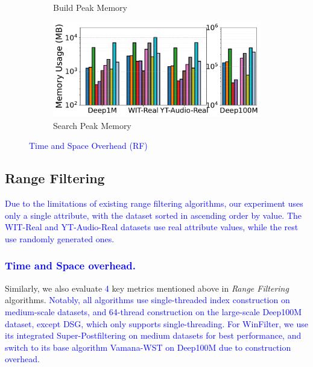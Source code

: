\documentclass[sigconf, nonacm]{acmart}
\begin{document}
{\begin{figure}[t]
\begin{subfigure}[t]{0.495\columnwidth}
			\caption{\footnotesize Build Peak Memory}
			\label{fig:rangeFilter_build_memory_mb}
		\end{subfigure}
		\hfill
		\begin{subfigure}[t]{0.495\columnwidth}
			\centering
			\includegraphics[width=\linewidth]{figures/searchMem/range_memory_comparison.pdf}
			\caption{\footnotesize Search Peak Memory}
			\label{fig:rangeFilter_search_memory_mb}
		\end{subfigure}
		
		\setlength{\abovecaptionskip}{0.1cm}
		\setlength{\belowcaptionskip}{-0.3cm}
		\caption{\textcolor{blue}{Time and Space Overhead (RF)}}
		\label{fig:rangeFilter_build_index_comparison}
	\end{figure}
	\subsection{Range Filtering}
	\textcolor{blue}{Due to the limitations of existing range filtering algorithms, our experiment uses only a single attribute, with the dataset sorted in ascending order by value. The WIT-Real and YT-Audio-Real datasets use real attribute values, while the rest use randomly generated ones. }
	\subsubsection{\textcolor{blue}{Time and Space overhead.}}
	
	Similarly, we also evaluate \textcolor{blue}{4} key metrics mentioned above in \textit{Range Filtering} algorithms. \textcolor{blue}{Notably, all algorithms use single-threaded index construction on medium-scale datasets, and 64-thread construction on the large-scale Deep100M dataset, except DSG, which only supports single-threading. For WinFilter, we use its integrated Super-Postfiltering on medium datasets for best performance, and switch to its base algorithm Vamana-WST on Deep100M due to construction overhead.
	}
	
}
\end{document}
